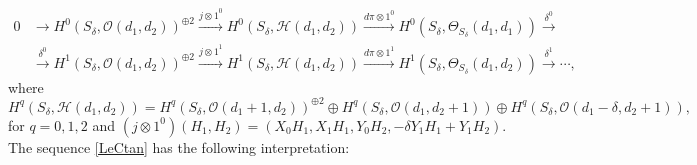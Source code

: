 \documentclass{amsart} %
\theoremstyle{definition}
\newcommand{\cts}{\Theta_{S_{\delta}}}
\newcommand{\cs}{S_{\delta}}
\newcommand{\mcO}{\mathcal{O}}
\newcommand{\mcH}{\mathcal{H}}
\begin{document}
\begin{equation}\label{LeCtan}
 \begin{split}
    0 & \rightarrow H^0(S_{\delta},\mcO(d_1, d_2))^{\oplus 2}
 \xrightarrow{{j\otimes 1}^0}
  H^0(S_{\delta}, \mcH(d_1, d_2) )
   \xrightarrow{{d \pi\otimes 1}^0} H^0(S_{\delta},\cts(d_1, d_1) ) \xrightarrow{\delta^0}  \\
      &      \xrightarrow{\delta^0}
      H^1(S_{\delta},\mcO(d_1, d_2))^{\oplus 2} \xrightarrow{{j\otimes 1}^1} H^1(S_{\delta}, \mcH(d_1, d_2) )
      \xrightarrow{{d \pi\otimes 1}^1} H^1(S_{\delta},\cts(d_1, d_2) ) \xrightarrow{\delta^1}
       \cdots ,
 \end{split}
\end{equation}
where
\begin{equation}\label{CohomTan}
  H^q(\cs, {\mcH}(d_1, d_2) ) = %
   H^q(\cs, \mcO(d_1 + 1, d_2) )^{\oplus 2} \oplus H^q(\cs, \mcO(d_1, d_2 + 1) )\oplus H^q(\cs, \mcO(d_1-\delta, d_2+1)),
\end{equation}
for $ q = 0,1,2 $ and
$ ({j\otimes 1}^0)(H_1,H_2) = (X_0H_1, X_1H_1, Y_0H_2, -\delta Y_1 H_1+Y_1H_2) $. The sequence \eqref{LeCtan} has the following interpretation:
\end{document}
